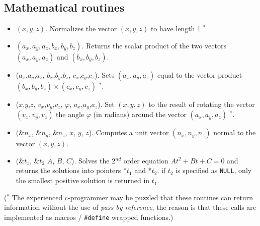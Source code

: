 \subsection{Mathematical routines}
\begin{itemize}
\item {}$(x,y,z)$. Normalizes the vector $(x,y,z)$ to have
  length 1 $^*$.
\item {}$(a_x,a_y,a_z, b_x,b_y,b_z)$. Returns the scalar
  product of the two vectors $(a_x,a_y,a_z)$ and $(b_x,b_y,b_z)$.
\item {}($a_x$,$a_y$,$a_z$, $b_x$,$b_y$,$b_z$, $c_x$,$c_y$,$c_z$). Sets
  $(a_x,a_y,a_z)$ equal to the vector product $(b_x,b_y,b_z) \times
  (c_x,c_y,c_z)$  $^*$.
\item {}($x$,$y$,$z$, $v_x$,$v_y$,$v_z$, $\varphi$, $a_x$,$a_y$,$a_z$). Set
  $(x,y,z)$ to the result of rotating the vector $(v_x,v_y,v_z)$
  the angle $\varphi$ (in radians) around the vector $(a_x,a_y,a_z)$  $^*$.
\item {}(\&$n_x$, \&$n_y$, \&$n_z$, $x$, $y$, $z$).
  Computes a unit vector $(n_x, n_y, n_z)$ normal to the vector
  $(x,y,z)$.
\item {}(\&$t_1$, \&$t_2$ $A$,  $B$,  $C$).
  Solves the 2$^{nd}$ order equation $At^2 + Bt + C = 0$ and returns
  the solutions into pointers *$t_1$ and  *$t_2$. if $t_2$ is
  specified as \verb+NULL+, only the smallest positive solution is
  returned in $t_1$.
\end{itemize}
($^*$ The experienced c-programmer may be puzzled that these routines
can return information without the use of \emph{pass by reference},
the reason is that these calls are implemented as macros /
\verb+#define+ wrapped functions.)

